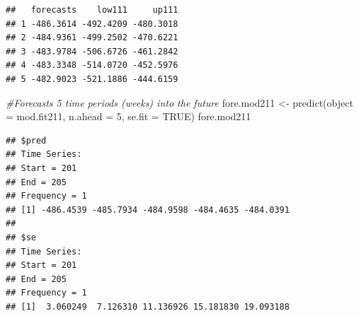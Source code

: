 \documentclass[
]{book}
\newenvironment{Shaded}{\begin{snugshade}}{\end{snugshade}}
\newcommand{\AttributeTok}[1]{\textcolor[rgb]{0.77,0.63,0.00}{#1}}
\newcommand{\CommentTok}[1]{\textcolor[rgb]{0.56,0.35,0.01}{\textit{#1}}}
\newcommand{\ConstantTok}[1]{\textcolor[rgb]{0.00,0.00,0.00}{#1}}
\newcommand{\DecValTok}[1]{\textcolor[rgb]{0.00,0.00,0.81}{#1}}
\newcommand{\FloatTok}[1]{\textcolor[rgb]{0.00,0.00,0.81}{#1}}
\newcommand{\FunctionTok}[1]{\textcolor[rgb]{0.00,0.00,0.00}{#1}}
\newcommand{\NormalTok}[1]{#1}
\newcommand{\OtherTok}[1]{\textcolor[rgb]{0.56,0.35,0.01}{#1}}
\newcommand{\SpecialCharTok}[1]{\textcolor[rgb]{0.00,0.00,0.00}{#1}}
\theoremstyle{definition}
\theoremstyle{definition}
\theoremstyle{definition}
\theoremstyle{definition}
\theoremstyle{remark}
\begin{document}
\begin{Shaded}
\end{Shaded}

\begin{verbatim}
##   forecasts    low111     up111
## 1 -486.3614 -492.4209 -480.3018
## 2 -484.9361 -499.2502 -470.6221
## 3 -483.9784 -506.6726 -461.2842
## 4 -483.3348 -514.0720 -452.5976
## 5 -482.9023 -521.1886 -444.6159
\end{verbatim}

\begin{Shaded}
\begin{Highlighting}[]
  \CommentTok{\#Forecasts 5 time periods (weeks) into the future}
\NormalTok{  fore.mod211 }\OtherTok{\textless{}{-}} \FunctionTok{predict}\NormalTok{(}\AttributeTok{object =}\NormalTok{ mod.fit211, }\AttributeTok{n.ahead =} \DecValTok{5}\NormalTok{, }\AttributeTok{se.fit =} \ConstantTok{TRUE}\NormalTok{)}
\NormalTok{  fore.mod211}
\end{Highlighting}
\end{Shaded}

\begin{verbatim}
## $pred
## Time Series:
## Start = 201 
## End = 205 
## Frequency = 1 
## [1] -486.4539 -485.7934 -484.9598 -484.4635 -484.0391
## 
## $se
## Time Series:
## Start = 201 
## End = 205 
## Frequency = 1 
## [1]  3.060249  7.126310 11.136926 15.181830 19.093188
\end{verbatim}
\end{document}
